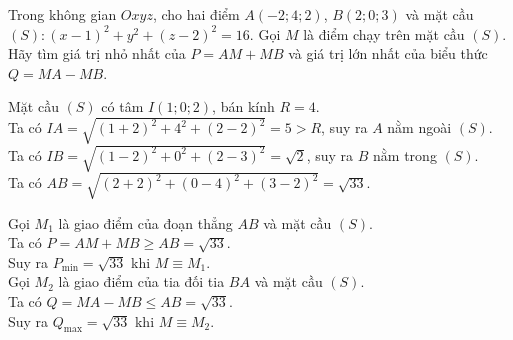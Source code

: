 \begin{bt}%
Trong không gian $Oxyz$, cho hai điểm $A(-2;4;2)$, $B(2;0;3)$ và mặt cầu $(S)\colon (x-1)^2+y^2+(z-2)^2=16$. Gọi $M$ là điểm chạy trên mặt cầu $(S)$. Hãy tìm giá trị nhỏ nhất của $P=AM+MB$ và giá trị lớn nhất của biểu thức $Q=MA-MB$.
\loigiai
{
\immini
{
Mặt cầu $(S)$ có tâm $I(1;0;2)$, bán kính $R=4$. \\
Ta có $IA=\sqrt{\left(1+2\right)^2+4^2+\left(2-2\right)^2}=5>R$, suy ra $A$ nằm ngoài $(S)$. \\
Ta có $IB=\sqrt{\left(1-2\right)^2+0^2+\left(2-3\right)^2}=\sqrt{2}$, suy ra $B$ nằm trong $(S)$. \\
Ta có $AB=\sqrt{\left(2+2\right)^2+\left(0-4\right)^2+\left(3-2\right)^2}=\sqrt{33}$.
}
{
}
\noindent
Gọi $M_1$ là giao điểm của đoạn thẳng $AB$ và mặt cầu $(S)$. \\
Ta có $P=AM+MB\geqslant AB=\sqrt{33}$. \\
Suy ra $P_{\min}=\sqrt{33}$ khi $M\equiv M_1$. \\
Gọi $M_2$ là giao điểm của tia đối tia $BA$ và mặt cầu $(S)$. \\
Ta có $Q=MA-MB\leqslant AB=\sqrt{33}$. \\
Suy ra $Q_{\max}=\sqrt{33}$ khi $M\equiv M_2$.
}
\end{bt}

